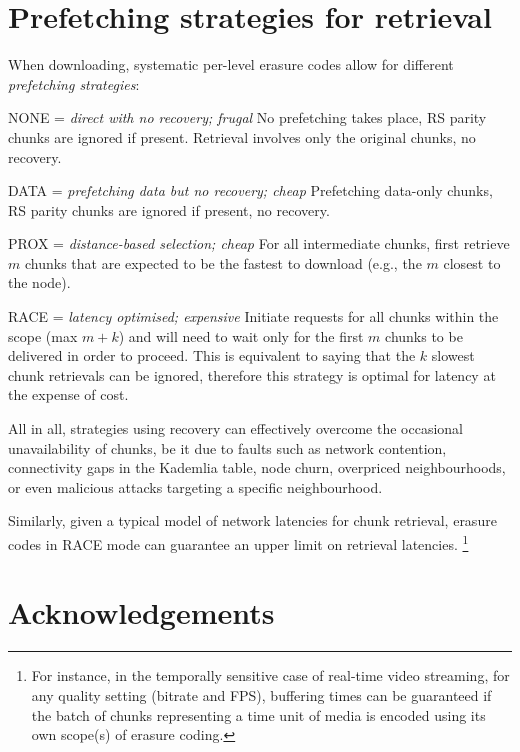 \documentclass[a4paper,11pt]{article}
\begin{document}
\section{Prefetching strategies for retrieval}
\label{sec:strategies}

When downloading, systematic per-level erasure codes allow for different \emph{prefetching strategies}:
\begin{labelledlist}
\item[\textsc{NONE} = \emph{direct with no recovery; frugal}] No prefetching takes place, RS parity chunks are ignored if present. Retrieval involves  only the original chunks, no recovery. 
\item[\textsc{DATA} = \emph{prefetching data but no recovery; cheap}] Prefetching data-only chunks, RS parity chunks are ignored if present, no recovery.
\item[\textsc{PROX} = \emph{distance-based selection; cheap}] For all intermediate chunks, first retrieve $ m$ chunks that are expected to be the fastest to download (e.g., the $m$ closest to the node).
\item[\textsc{RACE} = \emph{latency optimised; expensive}] Initiate requests for all chunks within the scope (max $m+k$) and will need to wait only for the first $m$ chunks to be delivered in order to proceed. This is equivalent to saying that the  $k$ slowest chunk retrievals can be ignored, therefore this strategy is optimal for latency at the expense of cost.
\end{labelledlist}



All in all, strategies using recovery  can effectively overcome the occasional unavailability of chunks, be it due to faults such as network contention, connectivity gaps in the Kademlia table, node churn, overpriced neighbourhoods, or even malicious attacks targeting a specific neighbourhood. 

Similarly, given a typical model of network latencies for chunk retrieval, erasure codes in \textsc{RACE} mode can guarantee an upper limit on retrieval latencies.%
%
\footnote{For instance, in the temporally sensitive case of real-time video streaming, for any quality setting (bitrate and FPS), buffering times can be guaranteed if the batch of chunks representing a time unit of media is encoded using its own scope(s) of erasure coding.}


\section*{Acknowledgements}
\end{document}
